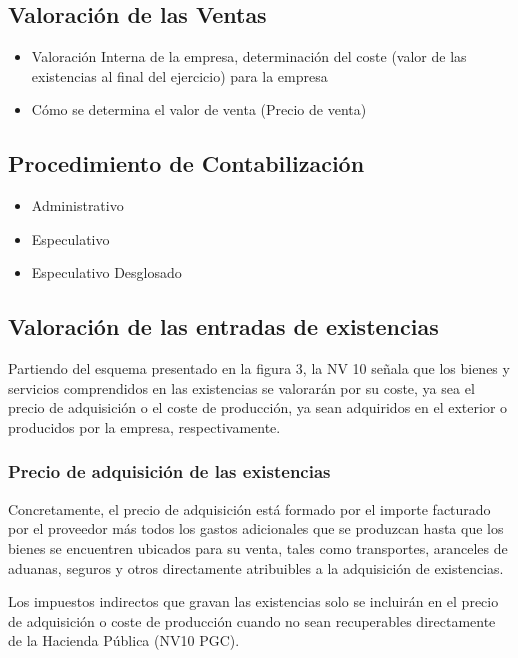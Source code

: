 \documentclass{article}
\begin{document}
\subsection{Valoración de las Ventas}
\begin{itemize}
    \item Valoración Interna de la empresa, determinación del coste (valor de las existencias al final del ejercicio) para la empresa
    \item Cómo se determina el valor de venta (Precio de venta)
\end{itemize}

\subsection{Procedimiento de Contabilización}
\begin{itemize}
    \item Administrativo
    \item Especulativo
    \item Especulativo Desglosado
\end{itemize}

\subsection{Valoración de las entradas de existencias}

Partiendo del esquema presentado en la figura 3, la NV 10 señala que los bienes y servicios comprendidos en las existencias se valorarán por su coste, ya sea el precio de adquisición o el coste de producción, ya sean adquiridos en el exterior o producidos por la empresa, respectivamente.

\subsubsection{Precio de adquisición de las existencias}

Concretamente, el precio de adquisición está formado por el importe facturado por el proveedor más todos los gastos adicionales que se produzcan hasta que los bienes se encuentren ubicados para su venta, tales como transportes, aranceles de aduanas, seguros y otros directamente atribuibles a la adquisición de existencias.

Los impuestos indirectos que gravan las existencias solo se incluirán en el precio de adquisición o coste de producción cuando no sean recuperables directamente de la Hacienda Pública (NV10 PGC).
\end{document}
